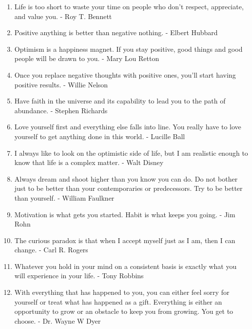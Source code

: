 \begin{enumerate}
        \item Life is too short to waste your time on people who don’t respect, appreciate, and value you. - Roy T. Bennett

        \item Positive anything is better than negative nothing. - Elbert Hubbard

        \item Optimism is a happiness magnet. If you stay positive, good things and good people will be drawn to you. - Mary Lou Retton

        \item Once you replace negative thoughts with positive ones, you’ll start having positive results. - Willie Nelson

        \item Have faith in the universe and its capability to lead you to the path of abundance. - Stephen Richards

        \item Love yourself first and everything else falls into line. You really have to love yourself to get anything done in this world. - Lucille Ball

        \item I always like to look on the optimistic side of life, but I am realistic enough to know that life is a complex matter. - Walt Disney

        \item Always dream and shoot higher than you know you can do. Do not bother just to be better than your contemporaries or predecessors. Try to be better than yourself. - William Faulkner

        \item Motivation is what gets you started. Habit is what keeps you going. - Jim Rohn

        \item The curious paradox is that when I accept myself just as I am, then I can change.
        - Carl R. Rogers

        \item Whatever you hold in your mind on a consistent basis is exactly what you will experience in your life. - Tony Robbins

        \item With everything that has happened to you, you can either feel sorry for yourself or treat what has happened as a gift. Everything is either an opportunity to grow or an obstacle to keep you from growing. You get to choose. - Dr. Wayne W Dyer


\end{enumerate}
